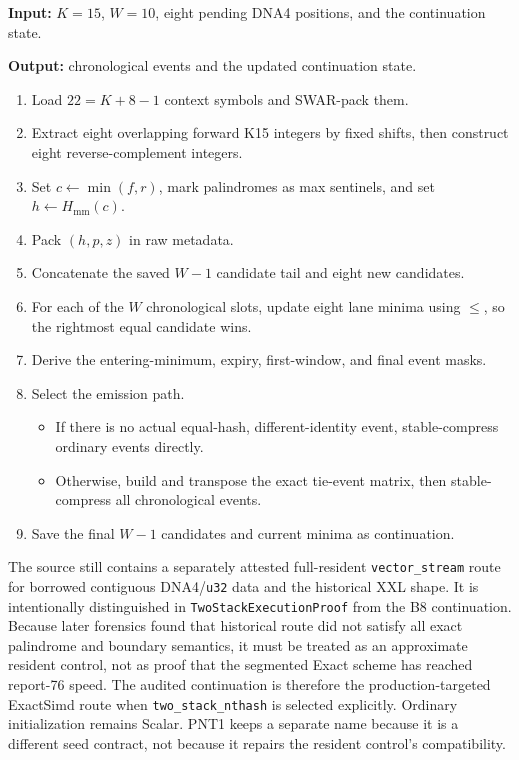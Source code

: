 \begin{algorithm}[H]
\caption{ExactSimd B8 block, simplified}
\label{alg:exact-b8}
\small
\textbf{Input:} \(K=15\), \(W=10\), eight pending DNA4 positions, and the
continuation state.

\textbf{Output:} chronological events and the updated continuation state.

\begin{enumerate}
  \item Load \(22=K+8-1\) context symbols and SWAR-pack them.
  \item Extract eight overlapping forward K15 integers by fixed shifts, then
    construct eight reverse-complement integers.
  \item Set \(c\gets\min(f,r)\), mark palindromes as max sentinels, and set
    \(h\gets H_{\mathrm{mm}}(c)\).
  \item Pack \((h,p,z)\) in raw metadata.
  \item Concatenate the saved \(W-1\) candidate tail and eight new candidates.
  \item For each of the \(W\) chronological slots, update eight lane minima
    using \(\le\), so the rightmost equal candidate wins.
  \item Derive the entering-minimum, expiry, first-window, and final event
    masks.
  \item Select the emission path.
    \begin{itemize}
      \item If there is no actual equal-hash, different-identity event,
        stable-compress ordinary events directly.
      \item Otherwise, build and transpose the exact tie-event matrix, then
        stable-compress all chronological events.
    \end{itemize}
  \item Save the final \(W-1\) candidates and current minima as continuation.
\end{enumerate}
\end{algorithm}

The source still contains a separately attested full-resident
\texttt{vector\_stream} route for borrowed contiguous DNA4/\texttt{u32} data
and the historical XXL shape.  It is intentionally distinguished in
\texttt{TwoStackExecutionProof} from the B8 continuation.  Because later
forensics found that historical route did not satisfy all exact palindrome and
boundary semantics, it must be treated as an approximate resident control, not
as proof that the segmented Exact scheme has reached report-76 speed. The
audited continuation is therefore the production-targeted ExactSimd route when
\texttt{two\_stack\_nthash} is selected explicitly. Ordinary initialization
remains Scalar. PNT1 keeps a separate name because it is a different seed
contract, not because it repairs the resident control's compatibility.

